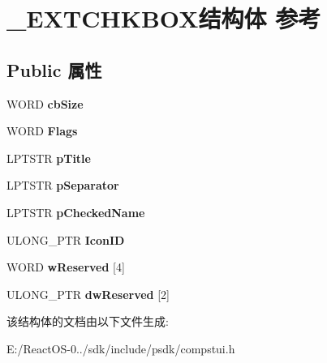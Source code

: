 \hypertarget{struct___e_x_t_c_h_k_b_o_x}{}\section{\+\_\+\+E\+X\+T\+C\+H\+K\+B\+O\+X结构体 参考}
\label{struct___e_x_t_c_h_k_b_o_x}
\subsection*{Public 属性}
\begin{DoxyCompactItemize}
\item 
\mbox{\label{struct___e_x_t_c_h_k_b_o_x_af02591f4568714d611487f51bc40416d}} 
W\+O\+RD {\bfseries cb\+Size}
\item 
\mbox{\label{struct___e_x_t_c_h_k_b_o_x_a59e323150b122676537ab03442984cc0}} 
W\+O\+RD {\bfseries Flags}
\item 
\mbox{\label{struct___e_x_t_c_h_k_b_o_x_a04e1ea1b298fe50942f7ed131f08d79e}} 
L\+P\+T\+S\+TR {\bfseries p\+Title}
\item 
\mbox{\label{struct___e_x_t_c_h_k_b_o_x_a586a58cea70dc1c5797393a4b4252263}} 
L\+P\+T\+S\+TR {\bfseries p\+Separator}
\item 
\mbox{\label{struct___e_x_t_c_h_k_b_o_x_aceaaad677df681b5612b843ba10ac958}} 
L\+P\+T\+S\+TR {\bfseries p\+Checked\+Name}
\item 
\mbox{\label{struct___e_x_t_c_h_k_b_o_x_ac54e2a621d9ba7a9019b3a5c35b34a55}} 
U\+L\+O\+N\+G\+\_\+\+P\+TR {\bfseries Icon\+ID}
\item 
\mbox{\label{struct___e_x_t_c_h_k_b_o_x_a9e535b7cc5e0ef589e5a0cc8e872ed59}} 
W\+O\+RD {\bfseries w\+Reserved} \mbox{[}4\mbox{]}
\item 
\mbox{\label{struct___e_x_t_c_h_k_b_o_x_a4b1d58403c561feb28d6f5ecd70614ee}} 
U\+L\+O\+N\+G\+\_\+\+P\+TR {\bfseries dw\+Reserved} \mbox{[}2\mbox{]}
\end{DoxyCompactItemize}


该结构体的文档由以下文件生成\+:\begin{DoxyCompactItemize}
\item 
E\+:/\+React\+O\+S-\/0../sdk/include/psdk/compstui.\+h\end{DoxyCompactItemize}
